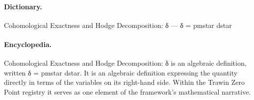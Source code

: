 \paragraph{Dictionary.}
Cohomological Exactness and Hodge Decomposition: δ — δ = pmstar dstar

\paragraph{Encyclopedia.}
Cohomological Exactness and Hodge Decomposition: δ is an algebraic definition, written δ = pmstar dstar. It is an algebraic definition expressing the quantity directly in terms of the variables on its right-hand side. Within the Trawin Zero Point registry it serves as one element of the framework's mathematical narrative.
